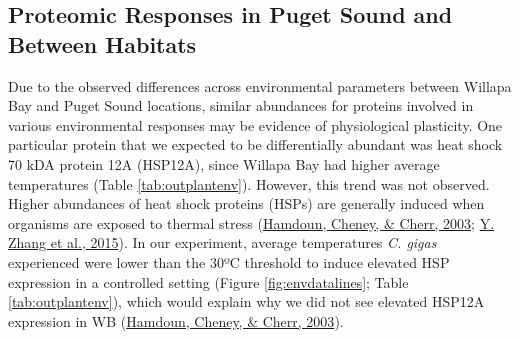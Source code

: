 \documentclass [11pt, proquest] {uwthesis}[2015/03/03]
\begin{document}
\hypertarget{proteomic-responses-in-puget-sound-and-between-habitats}{%
\subsection{Proteomic Responses in Puget Sound and Between Habitats}\label{proteomic-responses-in-puget-sound-and-between-habitats}}

Due to the observed differences across environmental parameters between Willapa Bay and Puget Sound locations, similar abundances for proteins involved in various environmental responses may be evidence of physiological plasticity. One particular protein that we expected to be differentially abundant was heat shock 70 kDA protein 12A (HSP12A), since Willapa Bay had higher average temperatures (Table \ref{tab:outplantenv}). However, this trend was not observed. Higher abundances of heat shock proteins (HSPs) are generally induced when organisms are exposed to thermal stress (\protect\hyperlink{ref-Hamdoun2003}{Hamdoun, Cheney, \& Cherr, 2003}; \protect\hyperlink{ref-Zhang2015}{Y. Zhang et al., 2015}). In our experiment, average temperatures \emph{C. gigas} experienced were lower than the 30ºC threshold to induce elevated HSP expression in a controlled setting (Figure \ref{fig:envdatalines}; Table \ref{tab:outplantenv}), which would explain why we did not see elevated HSP12A expression in WB (\protect\hyperlink{ref-Hamdoun2003}{Hamdoun, Cheney, \& Cherr, 2003}).
\end{document}
